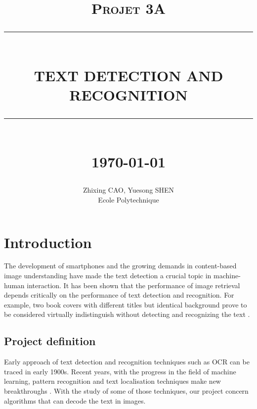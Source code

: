\documentclass[paper=a4, french, 11pt]{scrartcl}
\newcommand{\HRule}[1]{\rule{\linewidth}{#1}}
\begin{document}
\title{ \normalsize \textsc{Projet 3A}
        \\ [2.0cm]
        \HRule{0.5pt} \\
        \LARGE \textbf{\uppercase{Text detection and recognition}}
        \HRule{2pt} \\ [0.5cm]
        \normalsize \today \vspace*{5\baselineskip}}

\date{}

\author{
        Zhixing CAO, Yuesong SHEN \\
        Ecole Polytechnique }

\maketitle
\newpage
\tableofcontents
\newpage

\sectionfont{\scshape}



\section{Introduction}
The development of smartphones and the growing demands in content-based image understanding have made the text detection a crucial topic in machine-human interaction. It has been shown that the performance of image retrieval depends critically on the performance of text detection and recognition. For example, two book covers with different titles but identical background prove to be considered virtually indistinguish without detecting and recognizing the text \cite{epshtein2010detecting}.

\subsection{Project definition}
Early approach of text detection and recognition techniques such as OCR can be traced in early 1900s. Recent years, with the progress in the field of machine learning, pattern recognition and text localisation techniques make new breakthroughs \cite{anzai2012pattern}. With the study of some of those techniques, our project concern algorithms that can decode the text in images.
\end{document}

